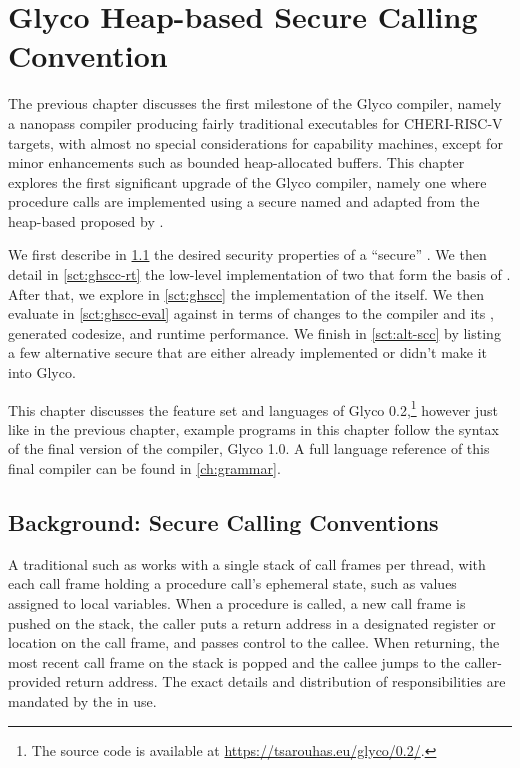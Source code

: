 \documentclass[main.tex]{subfiles}
\begin{document}
\onlyinsubfile{\mainmatter{}}

\chapter{Glyco Heap-based Secure Calling Convention} \label{ch:ghscc}
The previous chapter discusses the first milestone of the Glyco compiler, namely a nanopass compiler producing fairly traditional executables for CHERI-RISC-V targets, with almost no special considerations for capability machines, except for minor enhancements such as bounded heap-allocated buffers. This chapter explores the first significant upgrade of the Glyco compiler, namely one where procedure calls are implemented using a secure  named \textbf{} and adapted from the heap-based  proposed by \cite{cerise}.

We first describe in \cref{sct:scc} the desired security properties of a \enquote{secure} . We then detail in \cref{sct:ghscc-rt} the low-level implementation of two  that form the basis of . After that, we explore in \cref{sct:ghscc} the implementation of the  itself. We then evaluate in \cref{sct:ghscc-eval}  against  in terms of changes to the compiler and its , generated codesize, and runtime performance. We finish in \cref{sct:alt-scc} by listing a few alternative secure  that are either already implemented or didn't make it into Glyco.

This chapter discusses the feature set and languages of Glyco 0.2,\footnote{The source code is available at \url{https://tsarouhas.eu/glyco/0.2/}.} however just like in the previous chapter, example programs in this chapter follow the syntax of the final version of the compiler, Glyco 1.0. A full language reference of this final compiler can be found in \cref{ch:grammar}.

\section{Background: Secure Calling Conventions} \label{sct:scc}
A traditional  such as  works with a single stack of call frames per thread, with each call frame holding a procedure call's ephemeral state, such as values assigned to local variables. When a procedure is called, a new call frame is pushed on the stack, the caller puts a return address in a designated register or location on the call frame, and passes control to the callee. When returning, the most recent call frame on the stack is popped and the callee jumps to the caller-provided return address. The exact details and distribution of responsibilities are mandated by the  in use.
\end{document}
